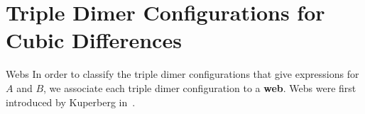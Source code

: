 \section{Triple Dimer Configurations for Cubic Differences}\label{section:tripledimers}

\begin{subsection}{Webs}\label{subsection:webs}
In order to classify the triple dimer configurations that give expressions for $A$ and $B$, we associate each triple dimer configuration to a \textbf{web}. Webs were first introduced by Kuperberg in~\cite{kup96}. 

\begin{figure}
\centering

\begin{tikzpicture}[x=0.75pt,y=0.75pt,yscale=-1,xscale=1]


\end{tikzpicture}
\end{figure}
\end{subsection}
